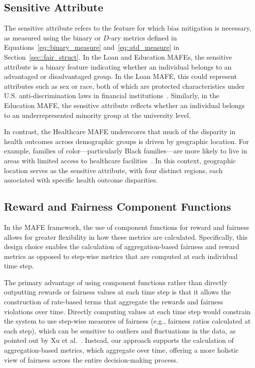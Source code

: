 \subsection{Sensitive Attribute}

The sensitive attribute refers to the feature for which bias mitigation is necessary, as measured using the binary or $D$-ary metrics defined in Equations~\ref{eq::binary_measure} and~\ref{eq::std_measure} in Section~\ref{sec::fair_struct}. In the Loan and Education MAFEs, the sensitive attribute is a binary feature indicating whether an individual belongs to an advantaged or disadvantaged group. In the Loan MAFE, this could represent attributes such as sex or race, both of which are protected characteristics under U.S. anti-discrimination laws in financial institutions~\cite{FDIC}. Similarly, in the Education MAFE, the sensitive attribute reflects whether an individual belongs to an underrepresented minority group at the university level.

In contrast, the Healthcare MAFE underscores that much of the disparity in health outcomes across demographic groups is driven by geographic location. For example, families of color—particularly Black families—are more likely to live in areas with limited access to healthcare facilities~\cite{hhs2024blackhistory}. In this context, geographic location serves as the sensitive attribute, with four distinct regions, each associated with specific health outcome disparities.

\vspace{-2mm}

\subsection{Reward and Fairness Component Functions}
\label{sec::component_func_remark}
In the MAFE framework, the use of component functions for reward and fairness allows for greater flexibility in how these metrics are calculated. Specifically, this design choice enables the calculation of aggregation-based fairness and reward metrics as opposed to step-wise metrics that are computed at each individual time step.

The primary advantage of using component functions rather than directly outputting rewards or fairness values at each time step is that it allows the construction of rate-based terms that aggregate the rewards and fairness violations over time. Directly computing values at each time step would constrain the system to use step-wise measures of fairness (e.g., fairness ratios calculated at each step), which can be sensitive to outliers and fluctuations in the data, as pointed out by Xu et al.~\cite{xuadapting}. Instead, our approach supports the calculation of aggregation-based metrics, which aggregate over time, offering a more holistic view of fairness across the entire decision-making process.

